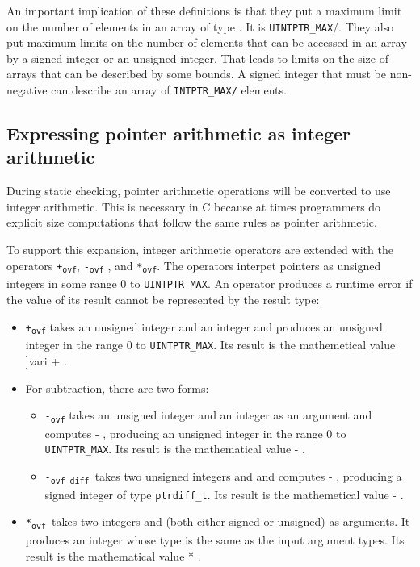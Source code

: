 An important implication of these definitions is that they put a maximum
limit on the number of elements in an array of type . It is
\texttt{UINTPTR\_MAX}/. They also put
maximum limits on the number of elements that can be accessed in an
array by a signed integer or an unsigned integer. That leads to limits
on the size of arrays that can be described by some bounds. A signed
integer that must be non-negative can describe an array of
\texttt{INTPTR\_MAX/} elements.

\subsection{Expressing pointer arithmetic as integer arithmetic}
\label{section:pointers-as-integers}

During static checking, pointer arithmetic operations will be converted
to use integer arithmetic. This is necessary in C because at times
programmers do explicit size computations that follow the same rules as
pointer arithmetic.

To support this expansion, integer arithmetic operators are extended
with the operators \texttt{+\textsubscript{ovf}},
\texttt{-\textsubscript{ovf}} , and \texttt{*\textsubscript{ovf}}. The
operators interpet pointers as unsigned integers in some range 0 to
\texttt{UINTPTR\_MAX}. An operator produces a runtime error if the value
of its result cannot be represented by the result type:

\begin{itemize}
\item
  \texttt{+\textsubscript{ovf}} takes an unsigned integer  and an
  integer  and produces an unsigned integer in the range 0 to
  \texttt{UINTPTR\_MAX}. Its result is the mathemetical value ]var{i} + .
\item
  For subtraction, there are two forms:

  \begin{itemize}
  \item
    \texttt{-\textsubscript{ovf}} takes an unsigned integer  and an
    integer  as an argument and computes  - , producing an unsigned
    integer in the range 0 to \texttt{UINTPTR\_MAX}. Its result is the
    mathematical value  - .
  \item
    \texttt{-\textsubscript{ovf\_diff }}takes two unsigned integers 
    and  and computes  - , producing a signed integer of type
    \texttt{ptrdiff\_t}. Its result is the mathemetical value  - .
  \end{itemize}
\item
  \texttt{*\textsubscript{ovf }}takes two integers  and  (both either
  signed or unsigned) as arguments. It produces an integer whose type is
  the same as the input argument types. Its result is the mathematical
  value  * .
\end{itemize}

